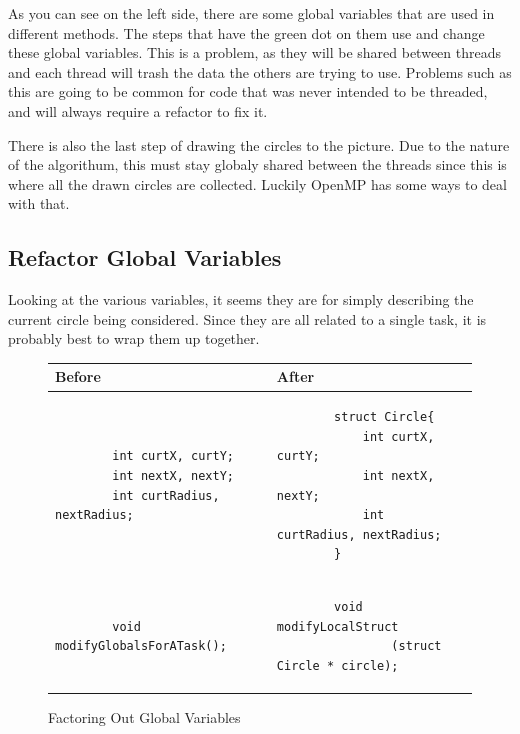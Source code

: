 \documentclass[12pt]{article}
\begin{document}
As you can see on the left side, there are some global variables that are used in different methods.
The steps that have the green dot on them use and change these global variables.
This is a problem, as they will be shared between threads and each thread will trash the data the others are trying to use.
Problems such as this are going to be common for code that was never intended to be threaded, and will always require a refactor to fix it.

There is also the last step of drawing the circles to the picture.
Due to the nature of the algorithum, this must stay globaly shared between the threads since this is where all the drawn circles are collected.
Luckily OpenMP has some ways to deal with that.

\subsection{Refactor Global Variables}

Looking at the various variables, it seems they are for simply describing the current circle being considered.
Since they are all related to a single task, it is probably best to wrap them up together.

\begin{figure}[htb]
	\centering
	\begin{tabular}{|p{}|p{}|}
	\hline
	Before & After \\ \hline \hline
	\begin{verbatim}
		int curtX, curtY;
		int nextX, nextY;
		int curtRadius, nextRadius;
	\end{verbatim}
	&
	\begin{verbatim}
		struct Circle{
			int curtX, curtY;
			int nextX, nextY;
			int curtRadius, nextRadius;
		}
	\end{verbatim}
	\\ \hline
	\begin{verbatim}
		void modifyGlobalsForATask();
	\end{verbatim}
	&
	\begin{verbatim}
		void modifyLocalStruct
				(struct Circle * circle);
	\end{verbatim}
	\\ \hline
	\end{tabular}
	\caption{Factoring Out Global Variables}
\end{figure}
\end{document}
